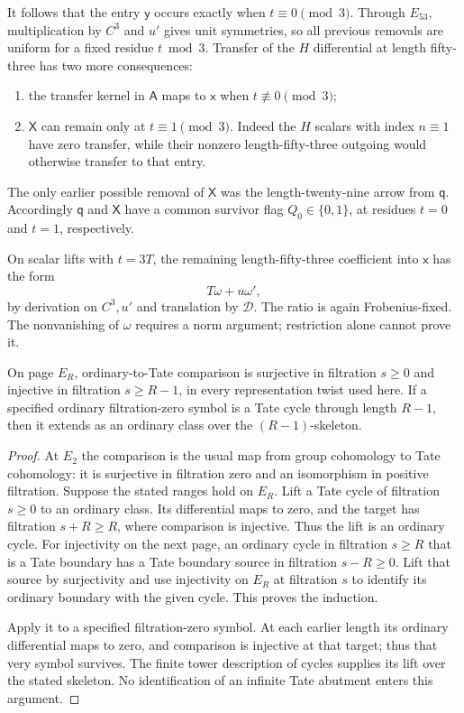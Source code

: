 It follows that the entry $\mathsf y$ occurs exactly when
$t\equiv0\pmod3$.  Through $E_{53}$, multiplication by
$C^3$ and $u'$ gives unit symmetries, so all previous
removals are uniform for a fixed residue $t\bmod3$.
Transfer of the $H$ differential at length fifty-three
has two more consequences:
\begin{enumerate}
\item the transfer kernel in $\mathsf A$ maps to
$\mathsf x$ when $t\not\equiv0\pmod3$;
\item $\mathsf X$ can remain only at $t\equiv1\pmod3$.
Indeed the $H$ scalars with index $n\equiv1$ have
zero transfer, while their nonzero length-fifty-three
outgoing would otherwise transfer to that entry.
\end{enumerate}
The only earlier possible removal of $\mathsf X$ was
the length-twenty-nine arrow from $\mathsf q$.
Accordingly $\mathsf q$ and $\mathsf X$ have a
common survivor flag $Q_0\in\{0,1\}$, at residues
$t=0$ and $t=1$, respectively.

On scalar lifts with $t=3T$, the remaining length-fifty-three
coefficient into $\mathsf x$ has the form
\begin{equation}\label{g:omega-form}
 T\omega+u\omega',
\end{equation}
by derivation on $C^3,u'$ and translation by
$\mathcal D$.  The ratio is again Frobenius-fixed.
The nonvanishing of $\omega$ requires a norm argument;
restriction alone cannot prove it.

\begin{lemma}\label{g:finite-comparison}
On page $E_R$, ordinary-to-Tate comparison is surjective
in filtration $s\ge0$ and injective in filtration
$s\ge R-1$, in every representation twist used here.
If a specified ordinary filtration-zero symbol is a Tate
cycle through length $R-1$, then it extends as an
ordinary class over the $(R-1)$-skeleton.
\end{lemma}

\begin{proof}
At $E_2$ the comparison is the usual map from group
cohomology to Tate cohomology: it is surjective in
filtration zero and an isomorphism in positive
filtration.  Suppose the stated ranges hold on $E_R$.
Lift a Tate cycle of filtration $s\ge0$ to an ordinary
class.  Its differential maps to zero, and the target
has filtration $s+R\ge R$, where comparison is
injective.  Thus the lift is an ordinary cycle.
For injectivity on the next page, an ordinary cycle in
filtration $s\ge R$ that is a Tate boundary has a
Tate boundary source in filtration $s-R\ge0$.
Lift that source by surjectivity and use injectivity
on $E_R$ at filtration $s$ to identify its ordinary
boundary with the given cycle.  This proves the
induction.

Apply it to a specified filtration-zero symbol.  At
each earlier length its ordinary differential maps
to zero, and comparison is injective at that target;
thus that very symbol survives.  The finite tower
description of cycles supplies its lift over the
stated skeleton.  No identification of an infinite
Tate abutment enters this argument.
\end{proof}

